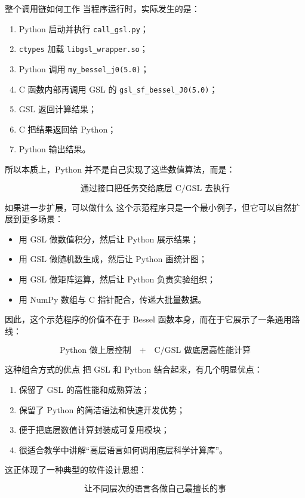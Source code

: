 \documentclass[aspectratio=169,11pt]{ctexbeamer}
\begin{document}
\begin{frame}{整个调用链如何工作}
当程序运行时，实际发生的是：

\begin{enumerate}
  \item Python 启动并执行 \texttt{call\_gsl.py}；
  \item \texttt{ctypes} 加载 \texttt{libgsl\_wrapper.so}；
  \item Python 调用 \texttt{my\_bessel\_j0(5.0)}；
  \item C 函数内部再调用 GSL 的 \texttt{gsl\_sf\_bessel\_J0(5.0)}；
  \item GSL 返回计算结果；
  \item C 把结果返回给 Python；
  \item Python 输出结果。
\end{enumerate}

\vspace{0.5em}
所以本质上，Python 并不是自己实现了这些数值算法，而是：

\[
\boxed{\text{通过接口把任务交给底层 C/GSL 去执行}}
\]
\end{frame}

\begin{frame}{如果进一步扩展，可以做什么}
这个示范程序只是一个最小例子，但它可以自然扩展到更多场景：

\begin{itemize}
  \item 用 GSL 做数值积分，然后让 Python 展示结果；
  \item 用 GSL 做随机数生成，然后让 Python 画统计图；
  \item 用 GSL 做矩阵运算，然后让 Python 负责实验组织；
  \item 用 NumPy 数组与 C 指针配合，传递大批量数据。
\end{itemize}

\vspace{0.5em}
因此，这个示范程序的价值不在于 Bessel 函数本身，而在于它展示了一条通用路线：

\[
\text{Python 做上层控制}
\quad+\quad
\text{C/GSL 做底层高性能计算}
\]
\end{frame}

\begin{frame}{这种组合方式的优点}
把 GSL 和 Python 结合起来，有几个明显优点：

\begin{enumerate}
  \item 保留了 GSL 的高性能和成熟算法；
  \item 保留了 Python 的简洁语法和快速开发优势；
  \item 便于把底层数值计算封装成可复用模块；
  \item 很适合教学中讲解“高层语言如何调用底层科学计算库”。
\end{enumerate}

\vspace{0.5em}
这正体现了一种典型的软件设计思想：

\[
\boxed{\text{让不同层次的语言各做自己最擅长的事}}
\]
\end{frame}
\end{document}
